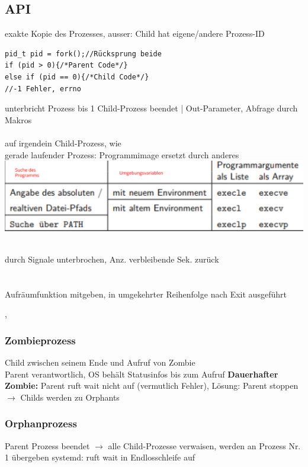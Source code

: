 \subsection{API}
exakte Kopie des Prozesses, ausser: Child hat eigene/andere Prozess-ID
\begin{verbatim}
pid_t pid = fork();//Rücksprung beide
if (pid > 0){/*Parent Code*/}
else if (pid == 0){/*Child Code*/}
//-1 Fehler, errno
\end{verbatim}
 unterbricht Prozess bis 1 Child-Prozess beendet |  Out-Parameter, Abfrage durch Makros\\
 \\
 auf irgendein Child-Prozess, wie \\

gerade laufender Prozess: Programmimage ersetzt durch anderes 
\includegraphics[scale = 0.1]{grafiken/exec.png}

\\ 
durch Signale unterbrochen, Anz. verbleibende Sek. zurück\\

\\
\\
Aufräumfunktion mitgeben, in umgekehrter Reihenfolge nach Exit ausgeführt 

, 

\subsubsection{Zombieprozess}
Child zwischen seinem Ende und Aufruf von  Zombie\\
Parent verantwortlich, OS behält Statusinfos bis zum Aufruf
\textbf{Dauerhafter Zombie: } Parent ruft wait nicht auf (vermutlich Fehler), Lösung: Parent stoppen $\rightarrow$ Childs werden zu Orphants

\subsubsection{Orphanprozess}
Parent Prozess beendet $\rightarrow$ alle Child-Prozesse verwaisen, werden an Prozess Nr. 1 übergeben
systemd: ruft wait in Endlosschleife auf
